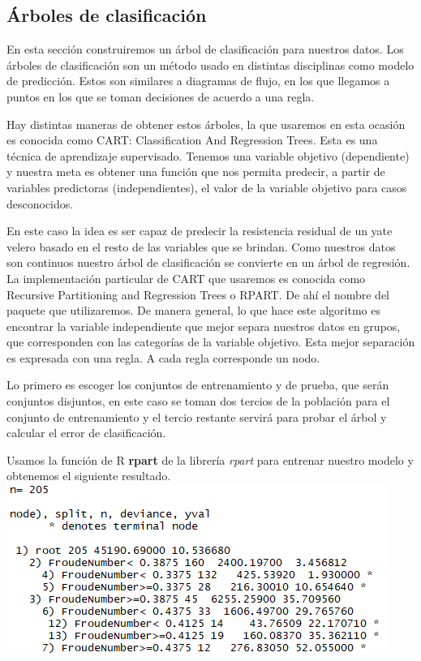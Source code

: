 \documentclass[twoside]{article}
\begin{document}
\begin{multicols}{2}
\subsection{\'Arboles de clasificaci\'on}
En esta secci\'on construiremos un \'arbol de clasificaci\'on para nuestros datos. Los \'arboles de clasificaci\'on son un m\'etodo usado en distintas disciplinas como modelo de predicci\'on. Estos son similares a diagramas de flujo, en los que llegamos a puntos en los que se toman decisiones de acuerdo a una regla.

Hay distintas maneras de obtener estos \'arboles, la que usaremos en esta ocasi\'on es conocida como CART: Classification And Regression Trees. Esta es una t\'ecnica de aprendizaje supervisado. Tenemos una variable objetivo (dependiente) y nuestra meta es obtener una funci\'on que nos permita predecir, a partir de variables predictoras (independientes), el valor de la variable objetivo para casos desconocidos.

En este caso la idea es ser capaz de predecir la resistencia residual de un yate velero basado en el resto de las variables que se brindan. Como nuestros datos son continuos nuestro \'arbol de clasificaci\'on se convierte en un \'arbol de regresi\'on. La implementaci\'on particular de CART que usaremos es conocida como Recursive Partitioning and Regression Trees o RPART. De ah\'i el nombre del paquete que utilizaremos. De manera general, lo que hace este algoritmo es encontrar la variable independiente que mejor separa nuestros datos en grupos, que corresponden con las categor\'ias de la variable objetivo. Esta mejor separaci\'on es expresada con una regla. A cada regla corresponde un nodo.

Lo primero es escoger los conjuntos de entrenamiento y de prueba, que ser\'an conjuntos disjuntos, en este caso se toman dos tercios de la poblaci\'on para el conjunto de entrenamiento y el tercio restante servir\'a para probar el \'arbol y calcular el error de clasificaci\'on.

Usamos la funci\'on de R \textbf{rpart} de la librer\'ia \textit{rpart} para entrenar nuestro modelo y obtenemos el siguiente resultado.\\

\includegraphics[scale=0.5]{images/pic_36.png} \\


\end{multicols}
\end{document}
